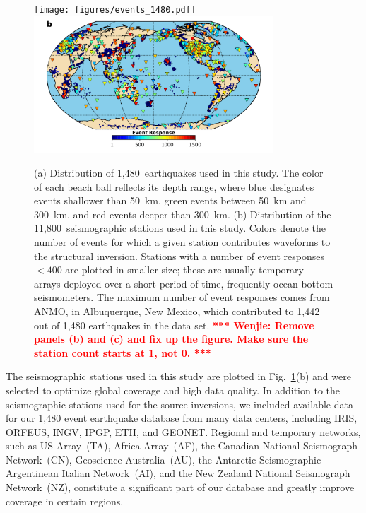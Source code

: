 \documentclass[extra,mreferee]{gji}
\newcommand{\red}[1]{\textbf{\textcolor{Red}{#1}}}
\newcommand{\towenjie}[1]{\textbf{\red{*** Wenjie: #1 ***}}}
\begin{document}
\begin{figure}
  \centering
  \texttt{[image: figures/events\_1480.pdf]} \\
  \includegraphics[width=0.8\textwidth]{figures/station_map.pdf}
  \caption{\small{(a) Distribution of 1,480~earthquakes used in this study. The color of each beach ball reflects its depth range, where blue designates events shallower than 50~km, green events between 50~km and 300~km, and red events deeper than 300~km.
  (b) Distribution of the 11,800~seismographic stations used in this study. Colors denote the number of events for which a given station contributes waveforms to the structural inversion. Stations with a number of event responses $<400$ are plotted in smaller size; these are usually temporary arrays deployed over a short period of time, frequently ocean bottom seismometers. The maximum number of event responses comes from ANMO, in Albuquerque, New Mexico, which contributed to 1,442 out of 1,480 earthquakes in the data set.
  \towenjie{Remove panels (b) and (c) and fix up the figure. Make sure the station count starts at 1, not 0.}
  }}
  \label{fig:eventsstations}
\end{figure}

The seismographic stations used in this study are plotted in Fig.~\ref{fig:eventsstations}(b) and
were selected to optimize global coverage
and high data quality.
In addition to the seismographic  stations used for the source inversions,
we included available data for our 1,480 event earthquake database from many data centers,
including IRIS, ORFEUS, INGV, IPGP, ETH, and GEONET.
Regional and temporary networks,
such as US Array~(TA),
Africa Array~(AF), the Canadian National Seismograph Network~(CN), Geoscience Australia~(AU),
the Antarctic Seismographic Argentinean Italian Network~(AI),
and the New Zealand National Seismograph Network~(NZ),
constitute a significant part
of our database and greatly improve coverage in certain regions.
\end{document}
